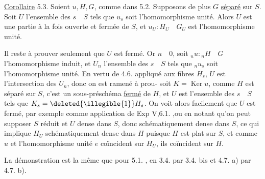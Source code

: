 

\uline{Corollaire} 5.3. Soient $u,H,G$, comme dans 5.2. Supposons de plus
$G$ \uline{séparé} sur $S$. Soit $U$ l'ensemble des $s\quad S$ tels que $u_s$ soit l'homomorphisme unité. Alors $U$ est une partie à la fois ouverte et fermée de $S$,
et $u_U:H_U\quad G_U$ est l'homomorphisme unité.

Il reste à prouver seulement que $U$ est fermé. Or 
$n\quad0$, soit ${}_n u:{}_n H\quad G$ l'homomorphisme induit, et $U_n$ l'ensemble des
$s\quad S$ tels que ${}_n u_s$ soit l'homomorphisme unité. En vertu de 4.6. appliqué
aux fibres $H_s$, $U$ est l'intersection des $U_n$, donc on est ramené à prou-
soit $K=\operatorname{Ker}u$, comme $H$ est séparé sur $S$, c'est un sous-préschéma
\uline{fermé} de $H$, et $U$ est l'ensemble des $s\quad S$ tels que $K_s=\deleted{\illegible{1}}H_s$. On
voit alors  facilement que $U$ est fermé, par exemple comme
application de Exp V,6.1. ,ou en  notant qu'on peut
supposer $S$ réduit et $U$ dense dans $S$, donc schématiquement dense dans $S$,
ce qui implique $H_U$ schématiquement dense dans $H$ puisque $H$ est plat sur
$S$, et comme $u$ et l'homomorphisme unité $e$ coïncident sur $H_U$, ils
coïncident sur $H$.

La démonstration est la même que pour 5.1. , en 
3.4. par 3.4. bis et 4.7. a) par 4.7. b).


